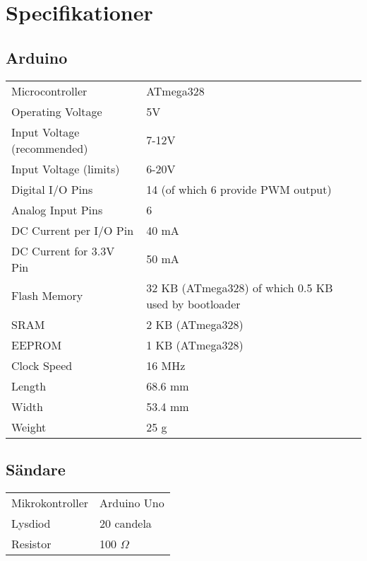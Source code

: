 \section{Specifikationer} %
\label{sec:specifikationer}

    \subsection{Arduino} %
    \label{sub:arduino_spec}
        \begin{tabularx}{\textwidth}{@{}lX}

            Microcontroller & ATmega328 \\
            Operating Voltage &  5V \\
            Input Voltage (recommended) & 7-12V \\
            Input Voltage (limits) & 6-20V \\
            Digital I/O Pins  &  14 (of which 6 provide PWM output) \\
            Analog Input Pins  & 6 \\
            DC Current per I/O Pin  & 40 mA \\
            DC Current for 3.3V Pin & 50 mA \\
            Flash Memory  &  32 KB (ATmega328) of which 0.5 KB used by bootloader \\
            SRAM  &  2 KB (ATmega328) \\
            EEPROM & 1 KB (ATmega328) \\
            Clock Speed & 16 MHz \\
            Length & 68.6 mm \\
            Width  & 53.4 mm \\
            Weight & 25 g     \\
        \end{tabularx}

    \subsection{Sändare} %
    \label{sub:sandare}
    \begin{tabularx}{\textwidth}{@{}lX}
        Mikrokontroller & Arduino Uno \\
        Lysdiod & 20\thinspace000 candela \\
        Resistor & 100 $\Omega$
        
    \end{tabularx}

